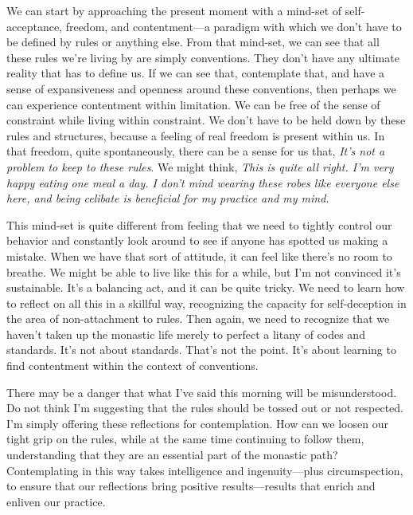 We can start by approaching the present moment with a mind-set of 
self-acceptance, freedom, and contentment---a paradigm with which we 
don't have to be defined by rules or anything else. From that mind-set, 
we can see that all these rules we're living by are simply conventions. 
They don't have any ultimate reality that has to define us. If we can 
see that, contemplate that, and have a sense of expansiveness and 
openness around these conventions, then perhaps we can experience 
contentment within limitation. We can be free of the sense of 
constraint while living within constraint. We don't have to be held 
down by these rules and structures, because a feeling of real freedom 
is present within us. In that freedom, quite spontaneously, there can 
be a sense for us that, \emph{It's not a problem to keep to these 
rules}. We might think, \emph{This is quite all right. I'm very happy 
eating one meal a day. I don't mind wearing these robes like everyone 
else here, and being celibate is beneficial for my practice and my 
mind.}

This mind-set is quite different from feeling that we need to tightly 
control our behavior and constantly look around to see if anyone has 
spotted us making a mistake. When we have that sort of attitude, it can 
feel like there's no room to breathe. We might be able to live like 
this for a while, but I'm not convinced it's sustainable. It's a 
balancing act, and it can be quite tricky. We need to learn how to 
reflect on all this in a skillful way, recognizing the capacity for 
self-deception in the area of non-attachment to rules. Then again, we 
need to recognize that we haven't taken up the monastic life merely to 
perfect a litany of codes and standards. It's not about standards. 
That's not the point. It's about learning to find contentment within 
the context of conventions.

There may be a danger that what I've said this morning will be 
misunderstood. Do not think I'm suggesting that the rules should be 
tossed out or not respected. I'm simply offering these reflections for 
contemplation. How can we loosen our tight grip on the rules, while at 
the same time continuing to follow them, understanding that they are an 
essential part of the monastic path? Contemplating in this way takes 
intelligence and ingenuity---plus circumspection, to ensure that our 
reflections bring positive results---results that enrich and enliven 
our practice.


